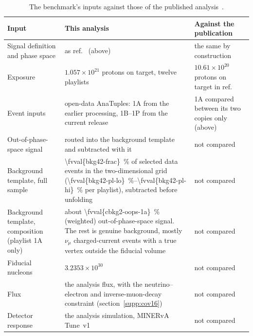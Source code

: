 \begin{table}[htbp]
\centering
\caption{The benchmark's inputs against those of the published analysis~\cite{MINERvA:2021owq}.}
\label{tab:bookkeeping}
\small
\begin{tabular}{@{}>{\raggedright\arraybackslash}p{}>{\raggedright\arraybackslash}p{}>{\raggedright\arraybackslash}p{}@{}}
\toprule
Input & This analysis & Against the publication \\
\midrule
Signal definition and phase space & as ref.~\cite{MINERvA:2021owq} (above) & the same by construction \\ \addlinespace
Exposure & $1.057\times10^{21}$ protons on target, twelve playlists & $10.61\times10^{20}$ protons on target in ref.~\cite{MINERvA:2021owq} \\ \addlinespace
Event inputs & open-data AnaTuples: 1A from the earlier processing, 1B--1P from the current release & 1A compared between its two copies only (above) \\ \addlinespace
Out-of-phase-space signal & routed into the background template and subtracted with it & not compared \\ \addlinespace
Background template, full sample & \SI{\fvval{bkg42-frac}}{\percent} of selected data events in the two-dimensional grid (\SIrange{\fvval{bkg42-pl-lo}}{\fvval{bkg42-pl-hi}}{\percent} per playlist), subtracted before unfolding & not compared \\ \addlinespace
Background template, composition (playlist 1A only) & about \SI{\fvval{cbkg2-oops-1a}}{\percent} (weighted) out-of-phase-space signal. The rest is genuine background, mostly $\nu_\mu$ charged-current events with a true vertex outside the fiducial volume & not compared \\ \addlinespace
Fiducial nucleons & $3.2353\times10^{30}$ & not compared \\ \addlinespace
Flux & the analysis flux, with the neutrino--electron and inverse-muon-decay constraint (section~\ref{supp:cov16}) & not compared \\ \addlinespace
Detector response & the analysis simulation, MINERvA Tune~v1 & not compared \\
\bottomrule
\end{tabular}
\end{table}

